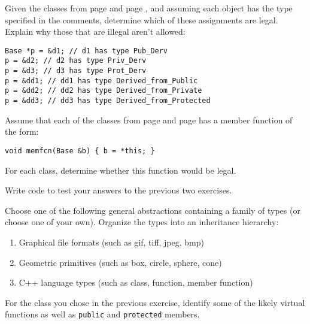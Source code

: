 %
%
\begin{question}
Given the classes from page \pageref{lst:public and private inherit} and page \pageref{lst:derived from public and private}, and
assuming each object has the type specified in the comments, determine
which of these assignments are legal. Explain why those that are illegal aren’t allowed:
\begin{lstlisting}
Base *p = &d1; // d1 has type Pub_Derv
p = &d2; // d2 has type Priv_Derv
p = &d3; // d3 has type Prot_Derv
p = &dd1; // dd1 has type Derived_from_Public
p = &dd2; // dd2 has type Derived_from_Private
p = &dd3; // dd3 has type Derived_from_Protected
\end{lstlisting}
\end{question}

\begin{question}
Assume that each of the classes from page \pageref{lst:public and private inherit} and page
\pageref{lst:derived from public and private} has a member function of the form:
\begin{lstlisting}
void memfcn(Base &b) { b = *this; }
\end{lstlisting}
For each class, determine whether this function would be legal.
\end{question}

\begin{question}
Write code to test your answers to the previous two exercises.
\end{question}

\begin{question}
Choose one of the following general abstractions containing
a family of types (or choose one of your own). Organize the types into an
inheritance hierarchy:
\begin{enumerate}[label=(\alph*)]
^^I\item Graphical file formats (such as gif, tiff, jpeg, bmp)
^^I\item Geometric primitives (such as box, circle, sphere, cone)
^^I\item C++ language types (such as class, function, member function)
\end{enumerate}
\end{question}

\begin{question}
For the class you chose in the previous exercise, identify
some of the likely virtual functions as well as \verb|public| and \verb|protected| members.
\end{question}
